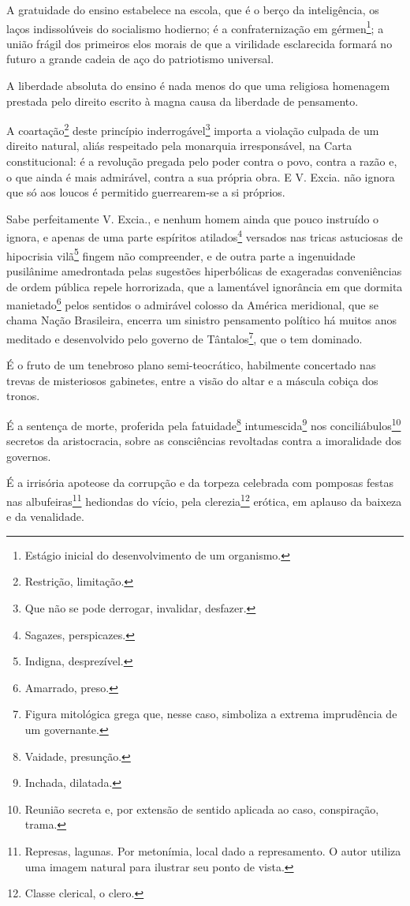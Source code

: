 A gratuidade do ensino estabelece na escola, que é o berço da
inteligência, os laços indissolúveis do socialismo hodierno; é a
confraternização em gérmen\footnote{Estágio inicial do desenvolvimento
  de um organismo.}; a união frágil dos primeiros elos morais de que a
virilidade esclarecida formará no futuro a grande cadeia de aço do
patriotismo universal.

A liberdade absoluta do ensino é nada menos do que uma religiosa
homenagem prestada pelo direito escrito à magna causa da liberdade de
pensamento.

A coartação\footnote{Restrição, limitação.} deste princípio
inderrogável\footnote{Que não se pode derrogar, invalidar, desfazer.}
importa a violação culpada de um direito natural, aliás respeitado pela
monarquia irresponsável, na Carta constitucional: é a revolução pregada
pelo poder contra o povo, contra a razão e, o que ainda é mais
admirável, contra a sua própria obra. E V. Excia. não ignora que só aos
loucos é permitido guerrearem-se a si próprios.

Sabe perfeitamente V. Excia., e nenhum homem ainda que pouco instruído o
ignora, e apenas de uma parte espíritos atilados\footnote{Sagazes,
  perspicazes.} versados nas tricas astuciosas de hipocrisia
vilã\footnote{Indigna, desprezível.} fingem não compreender, e de
outra parte a ingenuidade pusilânime amedrontada pelas sugestões
hiperbólicas de exageradas conveniências de ordem pública repele
horrorizada, que a lamentável ignorância em que dormita
manietado\footnote{Amarrado, preso.} pelos sentidos o admirável
colosso da América meridional, que se chama Nação Brasileira, encerra um
sinistro pensamento político há muitos anos meditado e desenvolvido pelo
governo de Tântalos\footnote{Figura mitológica grega que, nesse caso,
  simboliza a extrema imprudência de um governante.}, que o tem
dominado.

É o fruto de um tenebroso plano semi-teocrático, habilmente concertado
nas trevas de misteriosos gabinetes, entre a visão do altar e a máscula
cobiça dos tronos.

É a sentença de morte, proferida pela fatuidade\footnote{Vaidade,
  presunção.} intumescida\footnote{Inchada, dilatada.} nos
conciliábulos\footnote{Reunião secreta e, por extensão de sentido
  aplicada ao caso, conspiração, trama.} secretos da aristocracia, sobre
as consciências revoltadas contra a imoralidade dos governos.

É a irrisória apoteose da corrupção e da torpeza celebrada com pomposas
festas nas albufeiras\footnote{Represas, lagunas. Por metonímia, local
  dado a represamento. O autor utiliza uma imagem natural para ilustrar
  seu ponto de vista.} hediondas do vício, pela clerezia\footnote{
  Classe clerical, o clero.} erótica, em aplauso da baixeza e da
venalidade.

